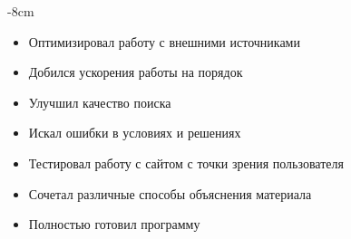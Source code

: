 \documentclass[10pt,a4paper]{altacv}
\begin{document}


\begin{adjustwidth}{}{-8cm}
\makecvheader
\end{adjustwidth}


\begin{itemize}
\item Оптимизировал работу с внешними источниками
\item Добился ускорения работы на порядок
\item Улучшил качество поиска
\end{itemize}
   

\divider

\begin{itemize}
\item Искал ошибки в условиях и решениях
\item Тестировал работу с сайтом с точки зрения пользователя
\end{itemize}
\divider

\begin{itemize}
\item Сочетал различные способы объяснения материала
\item Полностью готовил программу
\end{itemize}
\end{document}
